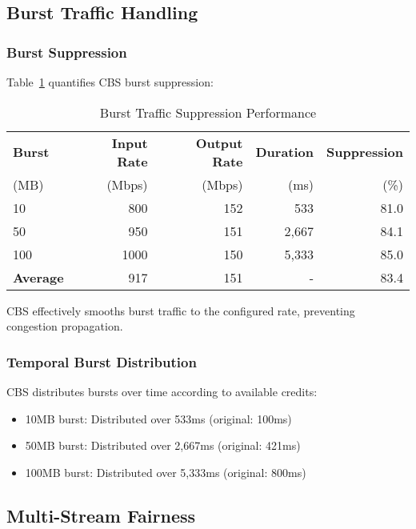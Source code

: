 \documentclass[10pt, journal, compsoc]{IEEEtran}
\begin{document}
\subsection{Burst Traffic Handling}

\subsubsection{Burst Suppression}

Table~\ref{tab:burst_suppression} quantifies CBS burst suppression:

\begin{table}[h]
\centering
\caption{Burst Traffic Suppression Performance}
\label{tab:burst_suppression}
\begin{tabular}{lrrrr}
\toprule
\textbf{Burst} & \textbf{Input Rate} & \textbf{Output Rate} & \textbf{Duration} & \textbf{Suppression} \\
(MB) & (Mbps) & (Mbps) & (ms) & (\%) \\
\midrule
10 & 800 & 152 & 533 & 81.0 \\
50 & 950 & 151 & 2,667 & 84.1 \\
100 & 1000 & 150 & 5,333 & 85.0 \\
\midrule
\textbf{Average} & 917 & 151 & - & 83.4 \\
\bottomrule
\end{tabular}
\end{table}

CBS effectively smooths burst traffic to the configured rate, preventing congestion propagation.

\subsubsection{Temporal Burst Distribution}

CBS distributes bursts over time according to available credits:

\begin{itemize}
    \item 10MB burst: Distributed over 533ms (original: 100ms)
    \item 50MB burst: Distributed over 2,667ms (original: 421ms)
    \item 100MB burst: Distributed over 5,333ms (original: 800ms)
\end{itemize}

\subsection{Multi-Stream Fairness}
\end{document}
